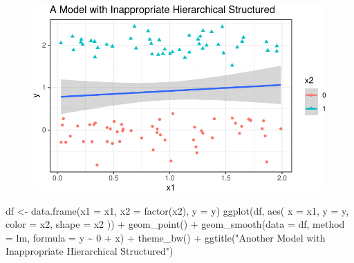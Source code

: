\documentclass[
  letterpaper,
  DIV=11,
  numbers=noendperiod]{scrreport}
\newenvironment{Shaded}{\begin{snugshade}}{\end{snugshade}}
\newcommand{\AttributeTok}[1]{\textcolor[rgb]{0.40,0.45,0.13}{#1}}
\newcommand{\DecValTok}[1]{\textcolor[rgb]{0.68,0.00,0.00}{#1}}
\newcommand{\FunctionTok}[1]{\textcolor[rgb]{0.28,0.35,0.67}{#1}}
\newcommand{\NormalTok}[1]{\textcolor[rgb]{0.00,0.23,0.31}{#1}}
\newcommand{\OtherTok}[1]{\textcolor[rgb]{0.00,0.23,0.31}{#1}}
\newcommand{\SpecialCharTok}[1]{\textcolor[rgb]{0.37,0.37,0.37}{#1}}
\newcommand{\StringTok}[1]{\textcolor[rgb]{0.13,0.47,0.30}{#1}}
\begin{document}
\begin{figure}[H]

{\centering \includegraphics{week5/week5_files/figure-pdf/unnamed-chunk-1-1.pdf}

}

\end{figure}

\begin{Shaded}
\begin{Highlighting}[]
\NormalTok{df }\OtherTok{\textless{}{-}} \FunctionTok{data.frame}\NormalTok{(}\AttributeTok{x1 =}\NormalTok{ x1, }\AttributeTok{x2 =} \FunctionTok{factor}\NormalTok{(x2), }\AttributeTok{y =}\NormalTok{ y)}
\FunctionTok{ggplot}\NormalTok{(df,}
       \FunctionTok{aes}\NormalTok{(}
         \AttributeTok{x =}\NormalTok{ x1,}
         \AttributeTok{y =}\NormalTok{ y,}
         \AttributeTok{color =}\NormalTok{ x2,}
         \AttributeTok{shape =}\NormalTok{ x2}
\NormalTok{       )) }\SpecialCharTok{+} 
  \FunctionTok{geom\_point}\NormalTok{() }\SpecialCharTok{+} 
    \FunctionTok{geom\_smooth}\NormalTok{(}\AttributeTok{data =}\NormalTok{ df, }
                \AttributeTok{method =} \StringTok{\textquotesingle{}lm\textquotesingle{}}\NormalTok{,  }
                \AttributeTok{formula =}\NormalTok{ y }\SpecialCharTok{\textasciitilde{}} \DecValTok{0} \SpecialCharTok{+}\NormalTok{ x) }\SpecialCharTok{+} 
  \FunctionTok{theme\_bw}\NormalTok{() }\SpecialCharTok{+} 
  \FunctionTok{ggtitle}\NormalTok{(}\StringTok{"Another Model with Inappropriate Hierarchical Structured"}\NormalTok{)}
\end{Highlighting}
\end{Shaded}
\end{document}
